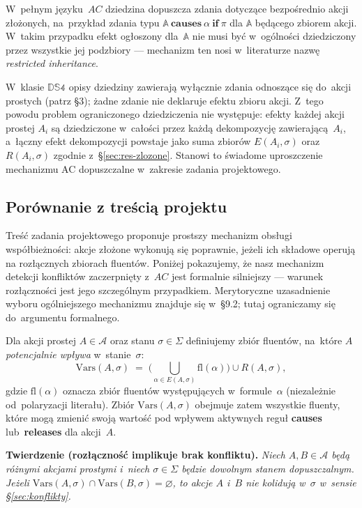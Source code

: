 \documentclass[11pt,a4paper]{article}
\newif\ifshowbib
\newcommand{\bibonly}[1]{\ifshowbib#1\fi}
\renewcommand{\cite}[2][]{\unskip}%
\newcommand{\causes}{\textbf{causes}}
\renewcommand{\iff}{\textbf{if}}
\newcommand{\releases}{\textbf{releases}}
\theoremstyle{definition}
\begin{document}
W~pełnym języku~$AC$\bibonly{~\cite{rw05}} dziedzina dopuszcza zdania
dotyczące bezpośrednio akcji złożonych, na~przykład zdania typu
$\mathbb{A}\ \causes\ \alpha\ \iff\ \pi$ dla $\mathbb{A}$ będącego
zbiorem akcji. W~takim przypadku efekt ogłoszony dla~$\mathbb{A}$ nie
musi być w~ogólności dziedziczony przez wszystkie jej podzbiory ---
mechanizm ten nosi w~literaturze nazwę \emph{restricted inheritance}.

W~klasie $\mathbb{DS4}$ opisy dziedziny zawierają wyłącznie zdania
odnoszące się do~akcji prostych (patrz \S3); żadne zdanie nie deklaruje
efektu zbioru akcji. Z~tego powodu problem ograniczonego dziedziczenia
nie występuje: efekty każdej akcji prostej $A_i$ są dziedziczone w~całości
przez każdą dekompozycję zawierającą~$A_i$, a~łączny efekt dekompozycji
powstaje jako suma zbiorów $E(A_i,\sigma)$ oraz $R(A_i,\sigma)$ zgodnie
z~\S\ref{sec:res-zlozone}. Stanowi to świadome uproszczenie mechanizmu
AC dopuszczalne w~zakresie zadania projektowego.

\subsection{Porównanie z treścią projektu}
\label{sec:porownanie-rozlacznosc}

Treść zadania projektowego\bibonly{~\cite{projekt4}} proponuje prostszy
mechanizm obsługi współbieżności: akcje złożone wykonują się poprawnie,
jeżeli ich składowe operują na rozłącznych zbiorach fluentów. Poniżej
pokazujemy, że nasz mechanizm detekcji konfliktów zaczerpnięty z~$AC$
jest formalnie silniejszy --- warunek rozłączności jest jego szczególnym
przypadkiem. Merytoryczne uzasadnienie wyboru ogólniejszego mechanizmu
znajduje się w~\S9.2; tutaj ograniczamy się do~argumentu formalnego.

\medskip
\noindent Dla akcji prostej $A \in \mathcal{A}$ oraz stanu $\sigma \in \Sigma$
definiujemy zbiór fluentów, na~które $A$ \emph{potencjalnie wpływa}
w~stanie~$\sigma$:
\[
  \mathrm{Vars}(A,\sigma)
    \;=\; \Big(\bigcup_{\alpha \in E(A,\sigma)} \mathrm{fl}(\alpha)\Big)
    \cup R(A,\sigma),
\]
gdzie $\mathrm{fl}(\alpha)$ oznacza zbiór fluentów występujących
w~formule~$\alpha$ (niezależnie od~polaryzacji literału). Zbiór
$\mathrm{Vars}(A,\sigma)$ obejmuje zatem wszystkie fluenty, które mogą
zmienić swoją wartość pod wpływem aktywnych reguł \causes{} lub~\releases{}
dla akcji~$A$.

\medskip
\noindent \textbf{Twierdzenie (rozłączność implikuje brak konfliktu).}
\emph{Niech $A, B \in \mathcal{A}$ będą różnymi akcjami prostymi
i~niech $\sigma \in \Sigma$ będzie dowolnym stanem dopuszczalnym.
Jeżeli $\mathrm{Vars}(A,\sigma) \cap \mathrm{Vars}(B,\sigma) = \varnothing$,
to akcje $A$ i~$B$ nie kolidują w~$\sigma$ w~sensie
\S\ref{sec:konflikty}.}
\end{document}
